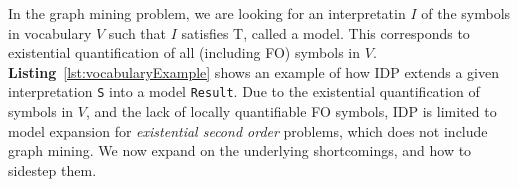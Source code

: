 In the graph mining problem, we are looking for an interpretatin $I$ of the symbols in vocabulary $V$ such that $I$ satisfies T, called a model.
This corresponds to existential quantification of all (including FO) symbols in $V$.
\textbf{Listing}~\ref{lst:vocabularyExample} shows an example of how IDP extends a given interpretation \lstinline{S} into a model \lstinline{Result}.
Due to the existential quantification of symbols in $V$, and the lack of locally quantifiable FO symbols, IDP is limited to model expansion for \emph{existential second order} problems, which does not include graph mining.
We now expand on the underlying shortcomings, and how to sidestep them.
%
%
%


